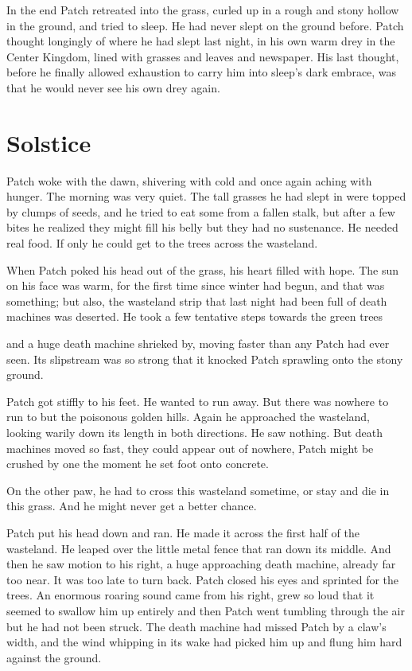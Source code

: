 \documentclass[12pt]{book}
\begin{document}
In the end Patch retreated into the grass, curled up in a rough and stony hollow in the ground, and tried to sleep. He had never slept on the ground before. Patch thought longingly of where he had slept last night, in his own warm drey in the Center Kingdom, lined with grasses and leaves and newspaper. His last thought, before he finally allowed exhaustion to carry him into sleep's dark embrace, was that he would never see his own drey again.


\section{Solstice}

Patch woke with the dawn, shivering with cold and once again aching with hunger. The morning was very quiet. The tall grasses he had slept in were topped by clumps of seeds, and he tried to eat some from a fallen stalk, but after a few bites he realized they might fill his belly but they had no sustenance. He needed real food. If only he could get to the trees across the wasteland.

When Patch poked his head out of the grass, his heart filled with hope. The sun on his face was warm, for the first time since winter had begun, and that was something; but also, the wasteland strip that last night had been full of death machines was deserted. He took a few tentative steps towards the green trees %

and a huge death machine shrieked by, moving faster than any Patch had ever seen. Its slipstream was so strong that it knocked Patch sprawling onto the stony ground.

Patch got stiffly to his feet. He wanted to run away. But there was nowhere to run to but the poisonous golden hills. Again he approached the wasteland, looking warily down its length in both directions. He saw nothing. But death machines moved so fast, they could appear out of nowhere, Patch might be crushed by one the moment he set foot onto concrete.

On the other paw, he had to cross this wasteland sometime, or stay and die in this grass. And he might never get a better chance.

Patch put his head down and ran. He made it across the first half of the wasteland. He leaped over the little metal fence that ran down its middle. And then he saw motion to his right, a huge approaching death machine, already far too near. It was too late to turn back. Patch closed his eyes and sprinted for the trees. An enormous roaring sound came from his right, grew so loud that it seemed to swallow him up entirely %
and then Patch went tumbling through the air %
but he had not been struck. The death machine had missed Patch by a claw's width, and the wind whipping in its wake had picked him up and flung him hard against the ground.
\end{document}
